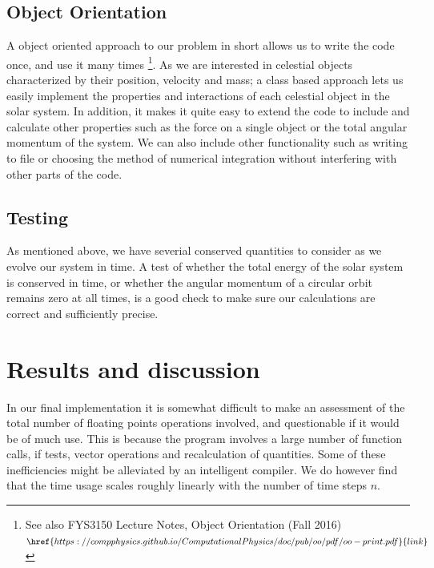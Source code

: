 \documentclass[%
 reprint,
 nobalance,
 amsmath,amssymb,
 aps,
]{revtex4-1}
\begin{document}
\subsection{Object Orientation}
A object oriented approach to our problem in short allows us to write the code once, and use it many times \footnote{See also FYS3150 Lecture Notes, Object Orientation (Fall 2016) $\href{https://compphysics.github.io/ComputationalPhysics/doc/pub/oo/pdf/oo-print.pdf}{link}$}.
As we are interested in celestial objects characterized by their position, velocity and mass; a class based approach lets us easily implement the properties and interactions of each celestial object in the solar system. In addition, it makes it quite easy to extend the code to include and calculate other properties such as the force on a single object or the total angular momentum of the system. We can also include other functionality such as writing to file or choosing the method of numerical integration without interfering with other parts of the code.


\subsection{\label{sec:Uni}Testing}
As mentioned above, we have severial conserved quantities to consider as we evolve our system in time. A test of whether the total energy of the solar system is conserved in time, or whether the angular momentum of a circular orbit remains zero at all times, is a good check to make sure our calculations are correct and sufficiently precise.



\section{Results and discussion}
In our final implementation it is somewhat difficult to make an assessment of the total number of floating points operations involved, and questionable if it would be of much use. This is because the program involves a large number of function calls, if tests, vector operations and recalculation of quantities. Some of these inefficiencies might be alleviated by an intelligent compiler. We do however find that the time usage scales roughly linearly with the number of time steps $n$.
\end{document}
